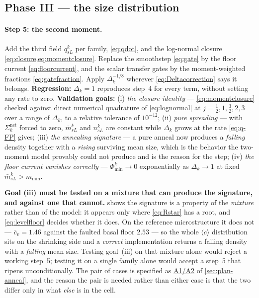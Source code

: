 \documentclass{article}
\newcommand{\cloop}{\ensuremath{\langle c\rangle}}
\begin{document}
\subsection{Phase III --- the size distribution}

\paragraph{Step 5: the second moment.} Add the third field $q^k_{sL}$ per family,
\cref{eq:qdot}, and the log-normal closure \cref{eq:closure,eq:momentclosure}.
Replace the smoothstep \cref{eq:gate} by the floor current
\cref{eq:floorcurrent}, and the scalar transfer gates by the moment-weighted
fractions \cref{eq:gatefraction}. Apply $\Delta_k^{-1/8}$ wherever
\cref{eq:Deltacorrection} says it belongs.
\textbf{Regression:} $\Delta_k=1$ reproduces step~4 for every term, without
setting any rate to zero.
\textbf{Validation goals:} (i) \emph{the closure identity} ---
\cref{eq:momentclosure} checked against direct numerical quadrature of
\cref{eq:lognormal} at $j=\tfrac12,1,\tfrac32,2,3$ over a range of $\Delta_k$,
to a relative tolerance of $10^{-12}$; (ii) \emph{pure spreading} --- with
$\Sigma^{\mathrm{net}}_k$ forced to zero, $\bar m^k_{sL}$ and $n^k_{sL}$ are
constant while $\Delta_k$ grows at the rate \cref{eq:q-FP} gives; (iii)
\emph{the annealing signature} --- a pure anneal now produces a \emph{falling}
density together with a \emph{rising} surviving mean size, which is the
behavior the two-moment model provably could not produce and is the reason for
the step; (iv) \emph{the floor current vanishes correctly} ---
$\Phi^k_{\min}\to0$ exponentially as $\Delta_k\to1$ at fixed
$\bar m^k_{sL}>m_{\min}$.

\textbf{Goal (iii) must be tested on a mixture that can produce the signature,
and against one that cannot.}  shows the signature is
a property of the \emph{mixture} rather than of the model: it appears only where
\cref{eq:Rstar} has a root, and \cref{eq:levelfloor} decides whether it does. On
the reference microstructure it does not --- $\bar c_v=1.46$ against the faulted
basal floor $2.53$ --- so the whole \cloop{} distribution sits on the shrinking
side and a \emph{correct} implementation returns a falling density with a
\emph{falling} mean size. Testing goal~(iii) on that mixture alone would reject a
working step~5; testing it on a single family alone would accept a step~5 that
ripens unconditionally. The pair of cases is specified as
\hyperref[tab:anneal-tests]{A1/A2} of \cref{sec:plan-anneal}, and the reason the
pair is needed rather than either case is that the two differ only in what
\emph{else} is in the cell.
\end{document}
